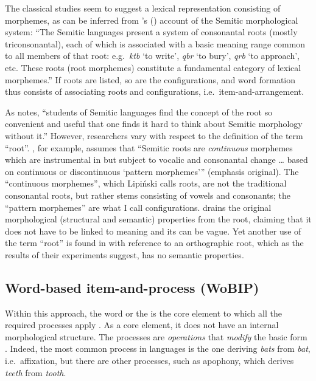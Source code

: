 \documentclass[output=paper,
modfonts
]{LSP/langsci}
\begin{document}
	The classical studies seem to suggest a lexical representation
consisting of morphemes, as can be inferred from \citeauthor{moscati1980a}'s (\citeyear[71]{moscati1980a}) account
of the Semitic morphological system: ``The Semitic languages present a
system of consonantal roots (mostly triconsonantal), each of which is
associated with a basic meaning range common to all members of that
root: e.g.\ \emph{ktb} `to write', \emph{qbr} `to bury', \emph{qrb} `to
approach', etc. These roots (root morphemes) constitute a fundamental
category of lexical morphemes.'' If roots are listed, so are the
	configurations, and word formation thus consists of associating roots
	and configurations, i.e.\ item-and-arrangement.
	
As \citet[139]{hoberman2006a} notes, ``students of Semitic languages find the
concept of the root so convenient and useful that one finds it hard to
think about Semitic morphology without it.'' However,
	researchers vary with respect to the definition of the term ``root''.
\citet[202]{lipinski1997a}, for example, assumes that ``Semitic roots are
\emph{continuous} morphemes which are instrumental in  but
subject to vocalic and consonantal change \ldots{} based on continuous
or discontinuous `pattern morphemes''' (emphasis original). The
``continuous morphemes'', which Lipiński calls roots, are not the
traditional consonantal roots, but rather stems consisting of vowels and
consonants; the ``pattern morphemes'' are what I call configurations.
\citet{aronoff2007a} drains the original morphological
(structural and semantic) properties from the root, claiming that it does not have to
be linked to meaning and its  can be vague. Yet another use of
the term ``root'' is found in \citet{Frost1997} with reference to an
orthographic root, which as the results of their experiments suggest,
has no semantic properties.
	
	\subsection{Word-based item-and-process (WoBIP)}\label{word-based-item-and-process-wobip}\label{sec:batel:2.2}
	
	Within this approach, the word or the  is the core element to which
	all the required processes apply \citep{aronoff1976}. As a core element, it
	does not have an internal morphological structure. The processes are
	\emph{operations} \citep[72]{anderson1992} that \emph{modify} the basic form
\citep[97]{Matthews1974}. Indeed, the most common process in languages is the
one deriving \emph{bats} from \emph{bat}, i.e.\ affixation, but there are
other processes, such as apophony, which derives \emph{teeth} from
\emph{tooth}.
	
\end{document}
